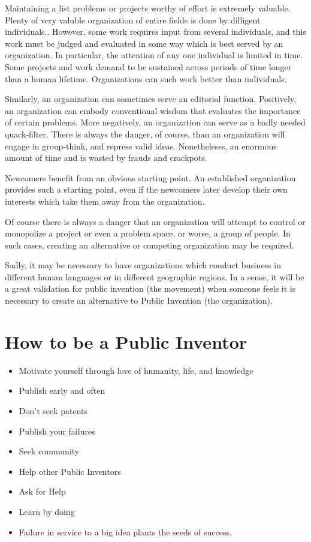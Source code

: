 \documentclass[
	fontsize=10pt, %
	twoside=false, %
	secnumdepth=1, %
]{kaobook}
\begin{document}
Maintaining a list problems or projects worthy of effort is extremely valuable.
Plenty of very valuble organization of entire fields is done by dilligent individuals..
However, some work requires input from several individuals, and this work must be judged and evaluated
in some way which is best served by an organization.
In particular, the attention of any one
individual is limited in time.
Some projects and work demand to be sustained across periods of time longer than a human lifetime.
Organizations can such work better than individuals.

Similarly, an organization can sometimes serve an editorial function.
Positively, an organization can embody conventional wisdom that
evaluates the importance of certain problems.
More negatively, an organization can serve as a badly needed quack-filter.
There is always the danger, of course, than an organization will engage in group-think,
and repress valid ideas.
Nonethelesss, an enormous amount of time and is wasted by frauds and crackpots.

Newcomers benefit from an obvious starting point.
An established organization provides such a starting point, even if the newcomers
later develop their own interests which take them away from the organization.

Of course there is always a danger that an organization will attempt to control or monopolize
a project or even a problem space, or worse, a group of people.
In such cases, creating an alternative or competing organization
may be required.

Sadly, it may be necessary to have organizations which conduct business in
different human languages or in different geographic regions.
In a sense, it will be a great validation for public invention (the movement) when
someone feels it is necessary to create an alternative to Public Invention (the organization).


\chapter{How to be a Public Inventor}
\begin{itemize}
\item Motivate yourself through love of humanity, life, and knowledge
\item Publish early and often
\item Don’t seek patents
\item Publish your failures
\item Seek community
\item Help other Public Inventors
\item Ask for Help
\item Learn by doing
\item Failure in service to a big idea plants the seeds of success.
\end{itemize}
\end{document}
